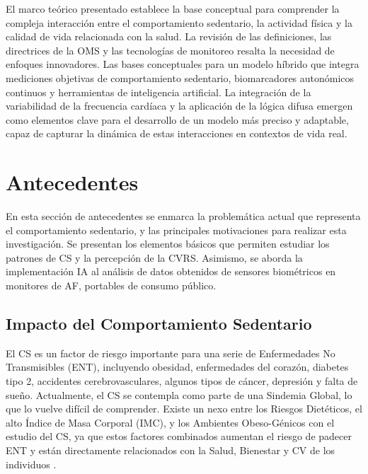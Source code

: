 El marco teórico presentado establece la base conceptual para comprender la compleja interacción entre el comportamiento sedentario, la actividad física y la calidad de vida relacionada con la salud. La revisión de las definiciones, las directrices de la OMS y las tecnologías de monitoreo resalta la necesidad de enfoques innovadores. Las bases conceptuales para un modelo híbrido que integra mediciones objetivas de comportamiento sedentario, biomarcadores autonómicos continuos y herramientas de inteligencia artificial. La integración de la variabilidad de la frecuencia cardíaca y la aplicación de la lógica difusa emergen como elementos clave para el desarrollo de un modelo más preciso y adaptable, capaz de capturar la dinámica de estas interacciones en contextos de vida real.

\section{Antecedentes}
\label{sec:antecedentes}

En esta sección de antecedentes se enmarca la problemática actual que representa el comportamiento sedentario, y las principales motivaciones para realizar esta investigación. Se presentan los elementos básicos que permiten estudiar los patrones de CS y la percepción de la CVRS. Asimismo, se aborda la implementación IA al análisis de datos obtenidos de sensores biométricos en monitores de AF, portables de consumo público.

\subsection{Impacto del Comportamiento Sedentario}
\label{subsec:impacto_cs}

El CS es un factor de riesgo importante para una serie de Enfermedades No Transmisibles (ENT), incluyendo obesidad, enfermedades del corazón, diabetes tipo 2, accidentes cerebrovasculares, algunos tipos de cáncer, depresión y falta de sueño. Actualmente, el CS se contempla como parte de una Sindemia Global, lo que lo vuelve difícil de comprender. Existe un nexo entre los Riesgos Dietéticos, el alto Índice de Masa Corporal (IMC), y los Ambientes Obeso-Génicos con el estudio del CS, ya que estos factores combinados aumentan el riesgo de padecer ENT y están directamente relacionados con la Salud, Bienestar y CV de los individuos \citep{Swinburn2019Syndemic}.

